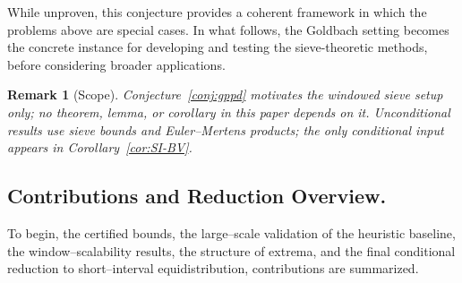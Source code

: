 \documentclass[11pt]{article}
\theoremstyle{inline}
\newtheorem*{remark}{Remark}
\theoremstyle{break}
\theoremstyle{break}
\theoremstyle{break}
\theoremstyle{break}
\theoremstyle{break}
\theoremstyle{break}
\theoremstyle{break}
\theoremstyle{inline}
\begin{document}
While unproven, this conjecture provides a coherent framework in which the problems above are special cases.  
In what follows, the Goldbach setting becomes the concrete instance for developing and testing the sieve-theoretic methods,  
before considering broader applications.

\begin{remark}[Scope]
Conjecture~\ref{conj:gppd} motivates the windowed sieve setup only; no theorem, lemma, or corollary in this paper depends on it. Unconditional results use sieve bounds and Euler–Mertens products; the only conditional input appears in Corollary~\ref{cor:SI-BV}.
\end{remark}


\subsection{Contributions and Reduction Overview.}
To begin, the certified bounds, the large–scale validation of the heuristic baseline, the window–scalability results, the structure of extrema, and the final conditional reduction to short–interval equidistribution, contributions are summarized.
\end{document}

